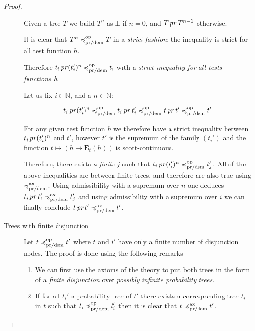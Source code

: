 \begin{proof}
\begin{description}
    Given a tree $T$ we build $T^n$ as $\bot$ if $n = 0$, and $T \operatorname{\mathit{pr}} T^{n-1}$
    otherwise. 

    It is clear that $T^n \preccurlyeq^{\text{op}}_{\text{pr/dem}} T$ in a \emph{strict fashion}:
    the inequality is strict for all test function $h$.

    Therefore $t_i \operatorname{\mathit{pr}} (t_i')^n \preccurlyeq^{\text{op}}_{\text{pr/dem}} t_i$
    with a \emph{strict inequality for all tests functions h}.
    
    Let us fix $i \in \mathbb{N}$, and a $n \in \mathbb{N}$: 

    \begin{equation*}
        t_i \operatorname{\mathit{pr}} (t_i')^n \preccurlyeq^{\text{op}}_{\text{pr/dem}} t_i \operatorname{\mathit{pr}} t_i'
        \preccurlyeq^{\text{op}}_{\text{pr/dem}} t \operatorname{\mathit{pr}} t' \preccurlyeq^{\text{op}}_{\text{pr/dem}} t'
    \end{equation*}

    For any given test function $h$ we therefore have a strict 
    inequality between $t_i \operatorname{\mathit{pr}} (t_i')^n$ and $t'$, however 
    $t'$ is the supremum of the family $(t_i')$ and the function 
    $ t \mapsto (h \mapsto \mathbf{E}_{ t } (h))$ is scott-continuous.

    Therefore, there exists \emph{a finite $j$} such that 
    $t_i \operatorname{\mathit{pr}} (t_i')^n \preccurlyeq^{\text{op}}_{\text{pr/dem}} t_j'$.
    All of the above inequalities are between finite trees, and 
    therefore are also true using $\preccurlyeq^{\text{ax}}_{\text{pr/dem}}$.
    Using admissibility with a supremum over $n$ 
    one deduces $t_i \operatorname{\mathit{pr}} t_i' \preccurlyeq^{\text{ax}}_{\text{pr/dem}} t_j'$
    and using admissibility with a supremum over $i$ we can finally conclude
    $t \operatorname{\mathit{pr}} t' \preccurlyeq^{\text{ax}}_{\text{pr/dem}} t'$.
    
      

        \item[Trees with finite disjunction]

    Let $t \preccurlyeq^{\text{op}}_{\text{pr/dem}} t'$ 
    where $t$ and $t'$ have only a finite number 
    of disjunction nodes.
    The proof is done using the following 
    remarks
    \begin{enumerate}
        \item We can first use the axioms of the theory 
            to put both trees in the form of 
            a \emph{finite disjunction} over 
            \emph{possibly infinite probability trees}.

        \item 
            If for all $t_i'$ 
            a probability
            tree of $t'$ there exists 
            a corresponding tree $t_i$ in $t$ 
            such that $t_i \preccurlyeq^{\text{op}}_{\text{pr/dem}} t_i'$
            then it is clear that $t \preccurlyeq^{\text{ax}}_{\text{pr/dem}} t'$.


\end{enumerate}
\end{description}
\end{proof}
